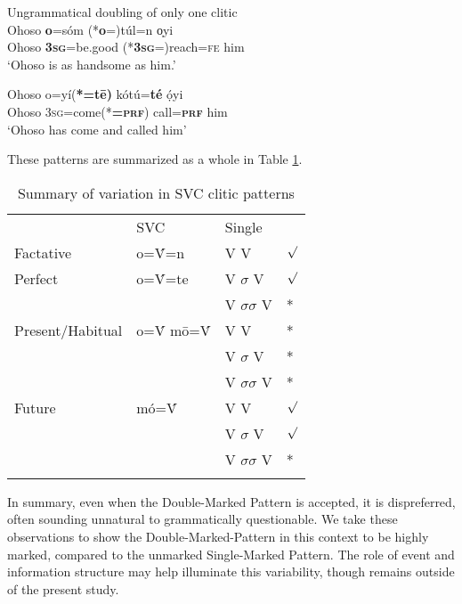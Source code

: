 \documentclass[output=paper]{langsci/langscibook}
\begin{document}
\ea\label{ex:rolle:ug}
{Ungrammatical doubling of only one clitic}\\
  \ea\label{ex:rolle:32}
\gll   Ohoso   \textbf{o}=sóm       (*\textbf{o}=)túl=n       o̩yi\\
       Ohoso  \textbf{\textsc{3sg}}=be.good   (*\textbf{\textsc{3sg}}=)reach=\textsc{fe}     him\\
\glt ‘Ohoso is as handsome as him.’

\ex\label{ex:rolle:33}
\gll   Ohoso  o=yí(\textbf{*=tē)}      kótú=\textbf{té}    ọ́yi\\
       Ohoso  \textsc{3sg}=come(*\textbf{=}\textbf{\textsc{prf}})  call=\textbf{\textsc{prf}}    him\\
\glt ‘Ohoso has come and called him’ \citep[285]{Kari2003a}
\z
\z 

These patterns are summarized as a whole in Table \ref{table:4}.

\begin{table}

\begin{tabularx}{\textwidth}{XXXX}
\lsptoprule

\multicolumn{2}{c}{} & {SVC}  & {Single}\\
\hhline{~~--} {Factative}  & {o=\'{V}=n}  & {V V} & {${\surd}$}\\
{Perfect}  & {o=\'{V}=te} & {V $\sigma $ V} & {${\surd}$}\\
&  & {V $\sigma \sigma $ V} & {*}\\
\hhline{----} {Present/Habitual} & {o=\'{V} mō=\'{V}} & {V V} & {*}\\
&  & {V $\sigma $ V} & {*}\\
 &  & {V $\sigma \sigma $ V} & {*}\\
\hhline{----} {Future} & {mó=\'{V}} & {V V} & {${\surd}$}\\
&  & {V $\sigma $ V} & {${\surd}$}\\
&  & {V $\sigma \sigma $ V} & {*}\\
\lspbottomrule
\end{tabularx}
\caption{Summary of variation in SVC clitic patterns}
\label{table:4}
\end{table}


In summary, even when the Double-Marked Pattern is accepted, it is dispreferred, often sounding unnatural to grammatically questionable. We take these observations to show the Double-Marked-Pattern in this context to be highly marked, compared to the unmarked Single-Marked Pattern. The role of event and information structure may help illuminate this variability, though remains outside of the present study.
\end{document}
